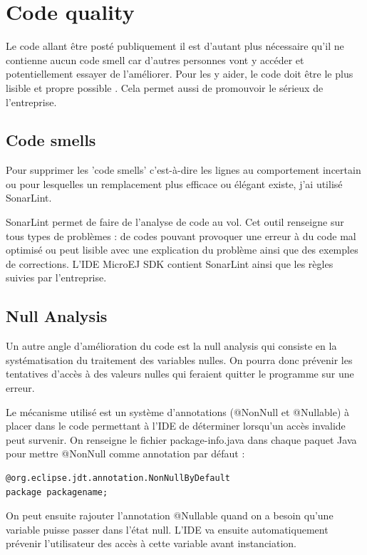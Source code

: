 \documentclass[french,a4paper,12pt]{report}
\begin{document}
\section{Code quality}

Le code allant être posté publiquement il est d’autant plus nécessaire qu’il ne contienne aucun code smell car d’autres personnes vont y accéder et potentiellement essayer de l’améliorer. Pour les y aider, le code doit être le plus lisible et propre possible . Cela permet aussi de promouvoir le sérieux de l’entreprise. 

\subsection{Code smells}

Pour supprimer les 'code smells' c'est-à-dire les lignes au comportement incertain ou pour lesquelles un remplacement plus efficace ou élégant existe, j'ai utilisé SonarLint.

SonarLint permet de faire de l’analyse de code au vol. Cet outil renseigne sur tous types de problèmes : de codes pouvant provoquer une erreur à du code mal optimisé ou peut lisible avec une explication du problème ainsi que des exemples de corrections.
L'IDE MicroEJ SDK contient SonarLint ainsi que les règles suivies par l'entreprise.

\subsection{Null Analysis}

Un autre angle d'amélioration du code est la null analysis qui consiste en la systématisation du traitement des variables nulles. On pourra donc prévenir les tentatives d'accès à des valeurs nulles qui feraient quitter le programme sur une erreur. 

Le mécanisme utilisé est un système d'annotations (@NonNull et @Nullable) à placer dans le code permettant à l'IDE de déterminer lorsqu'un accès invalide peut survenir. On renseigne le fichier package-info.java dans chaque paquet Java pour mettre @NonNull comme annotation par défaut :

\begin{lstlisting}
@org.eclipse.jdt.annotation.NonNullByDefault
package packagename;
\end{lstlisting}

On peut ensuite rajouter l'annotation @Nullable quand on a besoin qu'une variable puisse passer dans l'état null. L'IDE va ensuite automatiquement prévenir l'utilisateur des accès à cette variable avant instanciation.
\end{document}
